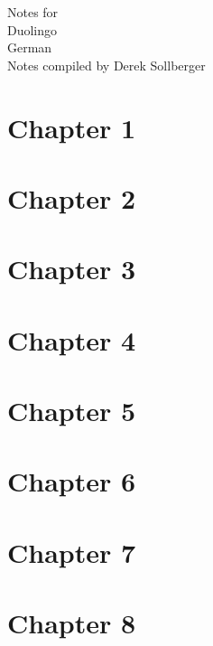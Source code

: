 \documentclass{article} %
\begin{document}

\begin{center}
\Large
Notes for
$$~$$
\Huge
Duolingo
$$~$$
\Large
German
$$~$$
\large
Notes compiled by Derek Sollberger
\end{center}


\pagebreak
{}
\tableofcontents


\pagebreak
{}
\section{Chapter 1}




\pagebreak
{}
\section{Chapter 2}



\pagebreak
{}
\section{Chapter 3}



\pagebreak
{}
\section{Chapter 4}



\pagebreak
{}
\section{Chapter 5}



\pagebreak
{}
\section{Chapter 6}




\pagebreak
{}
\section{Chapter 7}



\pagebreak
{}
\section{Chapter 8}
\end{document}
